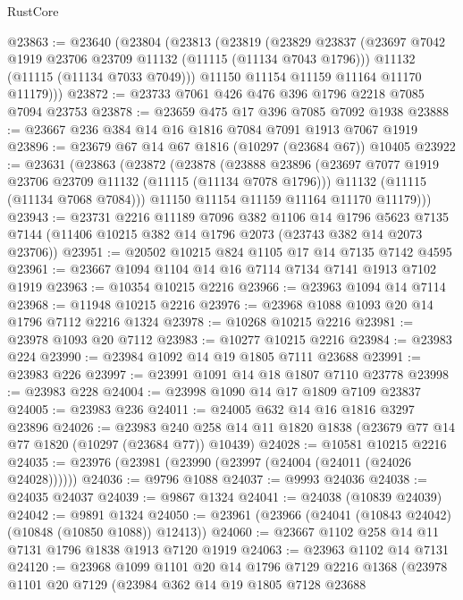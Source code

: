 \begin{lexlean}{RustCore}
\begin{coremodule}
@23863 := @23640
    (@23804
      (@23813
        (@23819
          (@23829
            @23837
            (@23697 @7042 @1919 @23706 @23709 @11132 (@11115 (@11134 @7043 @1796)))
            @11132
            (@11115 (@11134 @7033 @7049)))
          @11150
          @11154
          @11159
          @11164
          @11170
          @11179)))
@23872 := @23733 @7061 @426 @476 @396 @1796 @2218 @7085 @7094 @23753
@23878 := @23659 @475 @17 @396 @7085 @7092 @1938
@23888 := @23667 @236 @384 @14 @16 @1816 @7084 @7091 @1913 @7067 @1919
@23896 := @23679 @67 @14 @67 @1816 (@10297 (@23684 @67)) @10405
@23922 := @23631
    (@23863
      (@23872
        (@23878
          (@23888
            @23896
            (@23697 @7077 @1919 @23706 @23709 @11132 (@11115 (@11134 @7078 @1796)))
            @11132
            (@11115 (@11134 @7068 @7084)))
          @11150
          @11154
          @11159
          @11164
          @11170
          @11179)))
@23943 := @23731
    @2216
    @11189
    @7096
    @382
    @1106
    @14
    @1796
    @5623
    @7135
    @7144
    (@11406 @10215 @382 @14 @1796 @2073 (@23743 @382 @14 @2073 @23706))
@23951 := @20502 @10215 @824 @1105 @17 @14 @7135 @7142 @4595
@23961 := @23667 @1094 @1104 @14 @16 @7114 @7134 @7141 @1913 @7102 @1919
@23963 := @10354 @10215 @2216
@23966 := @23963 @1094 @14 @7114
@23968 := @11948 @10215 @2216
@23976 := @23968 @1088 @1093 @20 @14 @1796 @7112 @2216 @1324
@23978 := @10268 @10215 @2216
@23981 := @23978 @1093 @20 @7112
@23983 := @10277 @10215 @2216
@23984 := @23983 @224
@23990 := @23984 @1092 @14 @19 @1805 @7111 @23688
@23991 := @23983 @226
@23997 := @23991 @1091 @14 @18 @1807 @7110 @23778
@23998 := @23983 @228
@24004 := @23998 @1090 @14 @17 @1809 @7109 @23837
@24005 := @23983 @236
@24011 := @24005 @632 @14 @16 @1816 @3297 @23896
@24026 := @23983
    @240
    @258
    @14
    @11
    @1820
    @1838
    (@23679 @77 @14 @77 @1820 (@10297 (@23684 @77)) @10439)
@24028 := @10581 @10215 @2216
@24035 := @23976 (@23981 (@23990 (@23997 (@24004 (@24011 (@24026 @24028))))))
@24036 := @9796 @1088
@24037 := @9993 @24036
@24038 := @24035 @24037
@24039 := @9867 @1324
@24041 := @24038 (@10839 @24039)
@24042 := @9891 @1324
@24050 := @23961 (@23966 (@24041 (@10843 @24042) (@10848 (@10850 @1088)) @12413))
@24060 := @23667 @1102 @258 @14 @11 @7131 @1796 @1838 @1913 @7120 @1919
@24063 := @23963 @1102 @14 @7131
@24120 := @23968
    @1099
    @1101
    @20
    @14
    @1796
    @7129
    @2216
    @1368
    (@23978
      @1101
      @20
      @7129
      (@23984
        @362
        @14
        @19
        @1805
        @7128
        @23688

\end{coremodule}
\end{lexlean}
